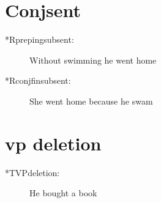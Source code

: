 \section {Conjsent}
\begin{description}
\item [*Rprepingsubsent:] Without swimming he went home
\item [*Rconjfinsubsent:] She went home because he swam
\end{description}
\section {vp deletion}
\begin{description}
\item [*TVPdeletion:] He bought a book
\end{description}

